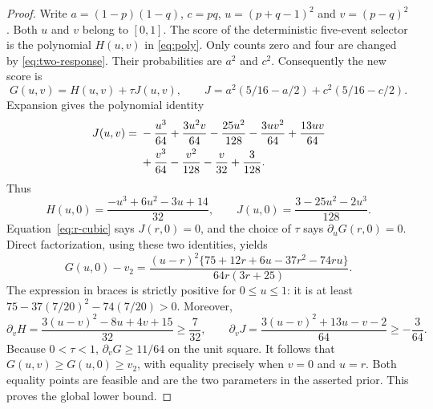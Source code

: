 \begin{proof}
Write $a=(1-p)(1-q)$, $c=pq$, $u=(p+q-1)^2$ and $v=(p-q)^2$.
Both $u$ and $v$ belong to $[0,1]$. The score of the deterministic
five-event selector is the polynomial $H(u,v)$ in \eqref{eq:poly}.
Only counts zero and four are changed by \eqref{eq:two-response}.
Their probabilities are $a^2$ and $c^2$. Consequently the new score is
\[
 G(u,v)=H(u,v)+\tau J(u,v),\qquad
 J=a^2(5/16-a/2)+c^2(5/16-c/2).
\]
Expansion gives the polynomial identity
\begin{align}\label{eq:J-two}
 J(u,v)={}&-\frac{u^3}{64}+\frac{3u^2v}{64}-\frac{25u^2}{128}
       -\frac{3uv^2}{64}+\frac{13uv}{64}\notag\\
 &+\frac{v^3}{64}-\frac{v^2}{128}-\frac v{32}+\frac3{128}.
\end{align}
Thus
\[
 H(u,0)=\frac{-u^3+6u^2-3u+14}{32},\qquad
 J(u,0)=\frac{3-25u^2-2u^3}{128}.
\]
Equation~\eqref{eq:r-cubic} says $J(r,0)=0$, and the choice of $\tau$
says $\partial_uG(r,0)=0$. Direct factorization, using these two
identities, yields
\begin{equation}\label{eq:two-square}
 G(u,0)-v_2=
 \frac{(u-r)^2\{75+12r+6u-37r^2-74ru\}}
      {64r(3r+25)}.
\end{equation}
The expression in braces is strictly positive for $0\le u\le1$:
it is at least $75-37(7/20)^2-74(7/20)>0$.
Moreover,
\[
 \partial_vH=\frac{3(u-v)^2-8u+4v+15}{32}\ge\frac7{32},\qquad
 \partial_vJ=\frac{3(u-v)^2+13u-v-2}{64}\ge-\frac3{64}.
\]
Because $0<\tau<1$, $\partial_vG\ge11/64$ on the unit square.
It follows that $G(u,v)\ge G(u,0)\ge v_2$, with equality precisely
when $v=0$ and $u=r$. Both equality points are feasible and are the two
parameters in the asserted prior. This proves the global lower bound.


\end{proof}
